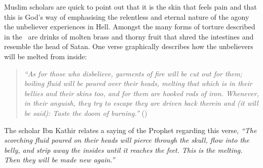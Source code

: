 \documentclass[12pt]{memoir}
\begin{document}
Muslim scholars are quick to point out that it is the skin
that feels pain and that this is God’s way of emphasising the relentless
and eternal nature of the agony the unbeliever experiences in Hell.
Amongst the many forms of torture described in the \Quran\
are drinks of molten brass and thorny fruit that shred
the intestines and resemble the head of Satan.
One verse graphically describes
how the unbelievers will be melted from inside:

\begin{quote}
\emph{%
“As for those who disbelieve, garments of fire will be cut out for them;
boiling fluid will be poured over their heads,
melting that which is in their bellies and their skins too,
and for them are hooked rods of iron.
Whenever, in their anguish, they try to escape they are driven back therein
and (it will be said): Taste the doom of burning.”}
()
\end{quote}

The scholar Ibn Kathir relates a saying of the Prophet regarding this verse,
\emph{“The scorching fluid poured on their heads will pierce through the skull,
flow into the belly, and strip away the insides until it reaches the feet.
This is the melting.
Then they will be made new again.”}
\end{document}
